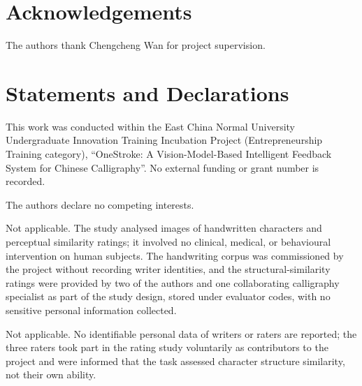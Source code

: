 \documentclass[iicol,pdflatex,sn-basic,Numbered]{sn-jnl}
\begin{document}

\maketitle










\backmatter

\section*{Acknowledgements}
The authors thank Chengcheng Wan for project supervision.

\section*{Statements and Declarations}

This work was conducted within the East China Normal University Undergraduate
Innovation Training Incubation Project (Entrepreneurship Training category),
``OneStroke: A Vision-Model-Based Intelligent Feedback System for Chinese
Calligraphy''. No external funding or grant number is recorded.

The authors declare no competing interests.

Not applicable. The study analysed images of handwritten characters and
perceptual similarity ratings; it involved no clinical, medical, or
behavioural intervention on human subjects. The handwriting corpus was
commissioned by the project without recording writer identities, and the
structural-similarity ratings were provided by two of the authors and one
collaborating calligraphy specialist as part of the study design, stored under
evaluator codes, with no sensitive personal information collected.

Not applicable. No identifiable personal data of writers or raters are
reported; the three raters took part in the rating study voluntarily as
contributors to the project and were informed that the task assessed
character structure similarity, not their own ability.
\end{document}
